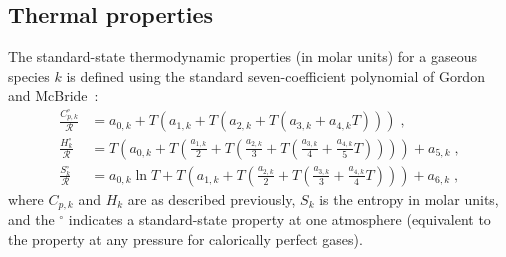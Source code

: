 \documentclass[12pt,number,sort&compress]{elsarticle}
\begin{document}
\subsection{Thermal properties}
The standard-state thermodynamic properties (in molar units) for a gaseous species $k$ is defined using the standard seven-coefficient polynomial of Gordon and McBride~\cite{gordon1994computer}:
\begin{align}
\frac{C_{p,k}^{\circ}}{\mathcal{R}} &= a_{0,k} + T \left( a_{1,k} + T \left( a_{2,k} + T \left( a_{3,k} + a_{4,k} T \right) \right) \right) \;, \label{e:cpk} \\
\frac{H_k^{\circ}}{\mathcal{R}} &= T \left( a_{0,k} + T \left( \frac{a_{1,k}}{2} + T \left( \frac{a_{2,k}}{3} + T \left( \frac{a_{3,k}}{4} + \frac{a_{4,k}}{5} T \right) \right) \right) \right) + a_{5,k} \;, \label{e:hk} \\
\frac{S_k^{\circ}}{\mathcal{R}} &= a_{0,k} \ln T + T \left( a_{1,k} + T \left( \frac{a_{2,k}}{2} + T \left( \frac{a_{3,k}}{3} + \frac{a_{4,k}}{4} T \right) \right) \right) + a_{6,k} \;, \label{e:sk}
\end{align}
where $C_{p,k}$ and $H_k$ are as described previously, $S_k$ is the entropy in molar units, and the ${}^{\circ}$ indicates a standard-state property at one atmosphere (equivalent to the property at any pressure for calorically perfect gases).
\end{document}
